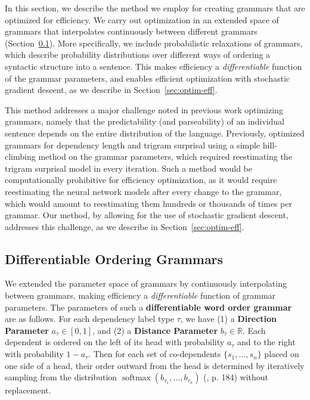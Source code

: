 \documentclass[10pt,twoside,lineno]{article}
\newcommand{\key}[1]{\textbf{#1}}
\begin{document}
In this section, we describe the method we employ for creating grammars that are optimized for efficiency.
We carry out optimization in an extended space of grammars that interpolates continuously between different grammars (Section~\ref{sec:diff-gramm}).
More specifically, we include probabilistic relaxations of grammars, which describe probability distributions over different ways of ordering a syntactic structure into a sentence.
This makes efficiency a \emph{differentiable} function of the grammar parameters, and enables efficient optimization with stochastic gradient descent, as we describe in Section~\ref{sec:optim-eff}.

This method addresses a major challenge noted in previous work optimizing grammars, namely that the predictability (and parseability) of an individual sentence depends on the entire distribution of the language.
Previously, \citep{gildea2015human} optimized grammars for dependency length and trigram surprisal using a simple hill-climbing method on the grammar parameters, which required reestimating the trigram surprisal model in every iteration.
Such a method would be computationally prohibitive for efficiency optimization, as it would require reestimating the neural network models after every change to the grammar, which would amount to reestimating them hundreds or thousands of times per grammar.
Our method, by allowing for the use of stochastic gradient descent, addresses this challenge, as we describe in Section~\ref{sec:optim-eff}.

\subsection{Differentiable Ordering Grammars}\label{sec:diff-gramm}

We extended the parameter space of grammars by continuously interpolating between grammars, making efficiency a \emph{differentiable} function of grammar parameters.
The parameters of such a \key{differentiable word order grammar} are as follows. 
For each dependency label type $\tau$, we have (1) a \key{Direction Parameter} $a_\tau \in [0,1]$, and (2) a \key{Distance Parameter} $b_\tau \in \mathbb{R}$. 
Each dependent is ordered on the left of its head with probability $a_\tau$ and to the right with probability $1-a_\tau$. 
Then for each set of co-dependents $\{s_1, \dots , s_n\}$ placed on one side of a head, their order outward from the head is determined by iteratively sampling from the distribution $\operatorname{softmax}(b_{\tau_1}, \dots, b_{\tau_n})$ (\cite{goodfellow2016deep}, p. 184) without replacement. 
\end{document}
